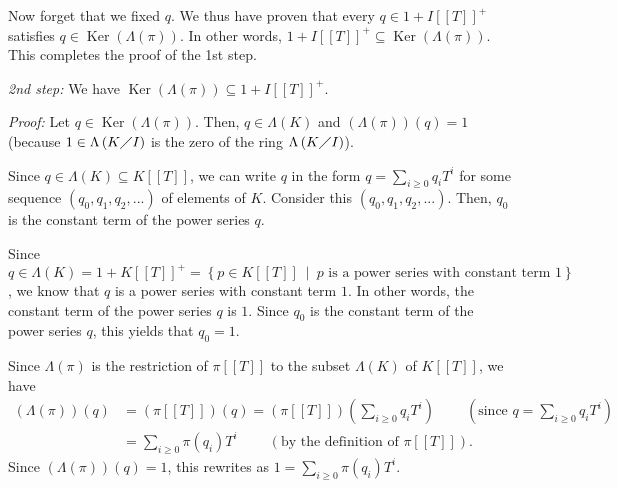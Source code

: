 \documentclass[numbers=enddot,12pt,final,onecolumn,notitlepage]{scrartcl}%
\begin{document}
Now forget that we fixed $q$. We thus have proven that every $q\in1+I\left[
\left[  T\right]  \right]  ^{+}$ satisfies $q\in\operatorname*{Ker}\left(
\Lambda\left(  \pi\right)  \right)  $. In other words, $1+I\left[  \left[
T\right]  \right]  ^{+}\subseteq\operatorname*{Ker}\left(  \Lambda\left(
\pi\right)  \right)  $. This completes the proof of the 1st step.

\textit{2nd step:} We have $\operatorname*{Ker}\left(  \Lambda\left(
\pi\right)  \right)  \subseteq1+I\left[  \left[  T\right]  \right]  ^{+}$.

\textit{Proof:} Let $q\in\operatorname*{Ker}\left(  \Lambda\left(  \pi\right)
\right)  $. Then, $q\in\Lambda\left(  K\right)  $ and $\left(  \Lambda\left(
\pi\right)  \right)  \left(  q\right)  =1$ (because $1\in\Lambda\left(
K\diagup I\right)  $ is the zero of the ring $\Lambda\left(  K\diagup
I\right)  $).

Since $q\in\Lambda\left(  K\right)  \subseteq K\left[  \left[  T\right]
\right]  $, we can write $q$ in the form $q=\sum\limits_{i\geq0}q_{i}T^{i}$
for some sequence $\left(  q_{0},q_{1},q_{2},...\right)  $ of elements of $K$.
Consider this $\left(  q_{0},q_{1},q_{2},...\right)  $. Then, $q_{0}$ is the
constant term of the power series $q$.

Since $q\in\Lambda\left(  K\right)  =1+K\left[  \left[  T\right]  \right]
^{+}=\left\{  p\in K\left[  \left[  T\right]  \right]  \ \mid\ p\text{ is a
power series with constant term }1\right\}  $, we know that $q$ is a power
series with constant term $1$. In other words, the constant term of the power
series $q$ is $1$. Since $q_{0}$ is the constant term of the power series $q$,
this yields that $q_{0}=1$.

Since $\Lambda\left(  \pi\right)  $ is the restriction of $\pi\left[  \left[
T\right]  \right]  $ to the subset $\Lambda\left(  K\right)  $ of $K\left[
\left[  T\right]  \right]  $, we have
\begin{align*}
\left(  \Lambda\left(  \pi\right)  \right)  \left(  q\right)   &  =\left(
\pi\left[  \left[  T\right]  \right]  \right)  \left(  q\right)  =\left(
\pi\left[  \left[  T\right]  \right]  \right)  \left(  \sum\limits_{i\geq
0}q_{i}T^{i}\right)  \ \ \ \ \ \ \ \ \ \ \left(  \text{since }q=\sum
\limits_{i\geq0}q_{i}T^{i}\right) \\
&  =\sum\limits_{i\geq0}\pi\left(  q_{i}\right)  T^{i}%
\ \ \ \ \ \ \ \ \ \ \left(  \text{by the definition of }\pi\left[  \left[
T\right]  \right]  \right)  .
\end{align*}
Since $\left(  \Lambda\left(  \pi\right)  \right)  \left(  q\right)  =1$, this
rewrites as $1=\sum\limits_{i\geq0}\pi\left(  q_{i}\right)  T^{i}$.
\end{document}
